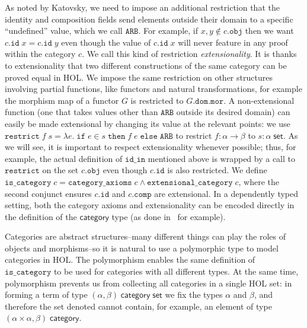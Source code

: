 \documentclass[twoside,titlepage,11pt]{article}
\begin{document}
As noted by Katovsky, we need to impose an additional restriction that the identity and composition fields send elements outside their domain to a specific ``undefined'' value, which we call $\mathtt{ARB}$.
For example, if $x,y\notin c.\mathtt{obj}$ then we want $c.\mathtt{id}\;x=c.\mathtt{id}\;y$ even though the value of $c.\mathtt{id}\;x$ will never feature in any proof within the category $c$.
We call this kind of restriction \emph{extensionality}.
It is thanks to extensionality that two different constructions of the same category can be proved equal in HOL.
We impose the same restriction on other structures involving partial functions, like functors and natural transformations, for example the morphism map of a functor $G$ is restricted to $G.\mathtt{dom}.\mathtt{mor}$.
A non-extensional function (one that takes values other than $\mathtt{ARB}$ outside its desired domain) can easily be made extensional by changing its value at the relevant points: we use $\mathtt{restrict}\;f\;s=\lambda{e}.\;\mathtt{if}\;e\in s\;\mathtt{then}\;f\;e\;\mathtt{else}\;\mathtt{ARB}$ to restrict $f:\alpha\to\beta$ to $s:\alpha\;\mathsf{set}$.
As we will see, it is important to respect extensionality whenever possible; thus, for example, the actual definition of $\mathtt{id\_in}$ mentioned above is wrapped by a call to $\mathtt{restrict}$ on the set $c.\mathtt{obj}$ even though $c.\mathtt{id}$ is also restricted.
We define $\mathtt{is\_category}\;c=\mathtt{category\_axioms}\;c\land\mathtt{extensional\_category}\;c$, where the second conjunct ensures $c.\mathtt{id}$ and $c.\mathtt{comp}$ are extensional.
In a dependently typed setting, both the category axioms and extensionality can be encoded directly in the definition of the $\mathsf{category}$ type (as done in~\cite{DBLP:conf/birthday/HuetS00,Sozeau,Megacz} for example).

Categories are abstract structures--many different things can play the roles of objects and morphisms--so it is natural to use a polymorphic type to model categories in HOL.
The polymorphism enables the same definition of $\mathtt{is\_category}$ to be used for categories with all different types.
At the same time, polymorphism prevents us from collecting all categories in a single HOL set: in forming a term of type $(\alpha,\beta)\;\mathsf{category}\;\mathsf{set}$ we fix the types $\alpha$ and $\beta$, and therefore the set denoted cannot contain, for example, an element of type $(\alpha\times\alpha,\beta)\;\mathsf{category}$.
\end{document}
